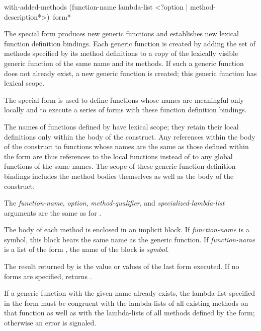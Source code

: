 \begin{defspec}
with-added-methods (function-name lambda-list
      <?option | {method-description}*>)
      {\,form}*

\relax
{}
\noindent
The  special form
produces new generic functions and establishes new
lexical function definition bindings.  Each generic function is created by
adding the set of methods specified by its method definitions to a copy of the
lexically visible generic function of the same name and its methods.  If
such a generic function does not already exist, a new generic function is
created; this generic function has lexical scope.

The special form  is used to define functions
whose names are meaningful only locally and to execute a series of
forms with these function definition bindings.


The names of functions defined by  have lexical
scope; they retain their local definitions only within the body of the
 construct.  Any references within the body of the
 construct to functions whose names are the same
as those defined within the  form are thus
references to the local functions instead of to any global functions
of the same names.  The scope of these generic function definition bindings
includes the method bodies themselves as well as the body of the 
 construct.





The \emph{function-name}, \emph{option}, \emph{method-qualifier}, and {\it
specialized-lambda-list\/} arguments are the same as for .

The body of each method is enclosed in an implicit block.  If
\emph{function-name\/} is a symbol, this block bears the same name as the
generic function.  If \emph{function-name\/} is a list of the form 
, the name of the block is \emph{symbol}.  


The result returned by  is the value or values
of the last form executed.  If no forms are specified, 
 returns .


If a generic function with the given name already exists, the
lambda-list specified in the  form must be
congruent with the lambda-lists of all existing methods on that
function as well as with the lambda-lists of all methods defined by the
 form; otherwise an error is signaled.


\end{defspec}
